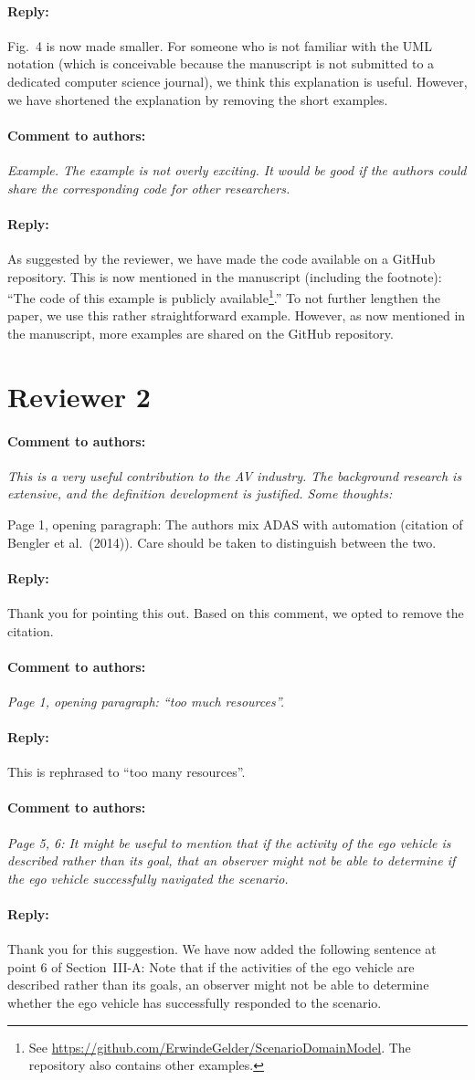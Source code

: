 \documentclass[10pt,final,a4paper,oneside,onecolumn]{article}
\newcommand{\toauthor}{\paragraph*{Comment to authors:} \itshape}
\newcommand{\fromauthor}{\paragraph*{Reply:} \normalfont}
\newcommand{\cstart}{\cbstart\color{red}}
\newcommand{\cend}{\cbend\color{black}}
\begin{document}
\fromauthor Fig.~4 is now made smaller. For someone who is not familiar with the UML notation (which is conceivable because the manuscript is not submitted to a dedicated computer science journal), we think this explanation is useful. However, we have shortened the explanation by removing the short examples.



\toauthor Example. The example is not overly exciting. It would be good if the authors could share the corresponding code for other researchers.

\fromauthor As suggested by the reviewer, we have made the code available on a GitHub repository. This is now mentioned in the manuscript (including the footnote): ``\cstart The code of this example is publicly available\footnote{\cstart See \url{https://github.com/ErwindeGelder/ScenarioDomainModel}. The repository also contains other examples.\cend}.\cend'' To not further lengthen the paper, we use this rather straightforward example. However, as now mentioned in the manuscript, more examples are shared on the GitHub repository.



\section*{Reviewer 2}

\toauthor This is a very useful contribution to the AV industry. The background research is extensive, and the definition development is justified. Some thoughts:

Page 1, opening paragraph: The authors mix ADAS with automation (citation of Bengler et al.\ (2014)). Care should be taken to distinguish between the two.

\fromauthor Thank you for pointing this out. Based on this comment, we opted to remove the citation.



\toauthor Page 1, opening paragraph: ``too much resources''.

\fromauthor This is rephrased to ``too \cstart many \cend resources''.



\toauthor Page 5, 6: It might be useful to mention that if the activity of the ego vehicle is described rather than its goal, that an observer might not be able to determine if the ego vehicle successfully navigated the scenario.

\fromauthor Thank you for this suggestion. We have now added the following sentence at point 6 of Section~III-A: \cstart Note that if the activities of the ego vehicle are described rather than its goals, an observer might not be able to determine whether the ego vehicle has successfully responded to the scenario.\cend
\end{document}
